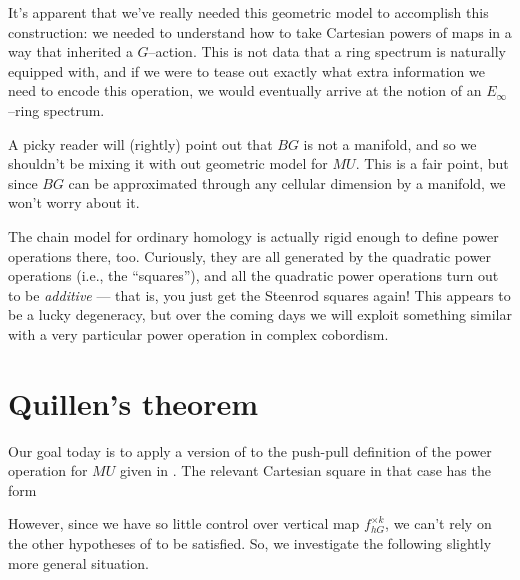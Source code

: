 \begin{remark}
It's apparent that we've really needed this geometric model to accomplish this construction: we needed to understand how to take Cartesian powers of maps in a way that inherited a $G$--action.  This is not data that a ring spectrum is naturally equipped with, and if we were to tease out exactly what extra information we need to encode this operation, we would eventually arrive at the notion of an $E_\infty$--ring spectrum.
\end{remark}

\begin{remark}
A picky reader will (rightly) point out that $BG$ is not a manifold, and so we shouldn't be mixing it with out geometric model for $MU$.  This is a fair point, but since $BG$ can be approximated through any cellular dimension by a manifold, we won't worry about it.
\end{remark}

\begin{remark}
The chain model for ordinary homology is actually rigid enough to define power operations there, too.  Curiously, they are all generated by the quadratic power operations (i.e., the ``squares''), and all the quadratic power operations turn out to be \emph{additive} --- that is, you just get the Steenrod squares again!  This appears to be a lucky degeneracy, but over the coming days we will exploit something similar with a very particular power operation in complex cobordism.
\end{remark}









\section{Quillen's theorem}


Our goal today is to apply a version of  to the push-pull definition of the power operation for $MU$ given in .  The relevant Cartesian square in that case has the form
\begin{center}
\end{center}
However, since we have so little control over vertical map $f^{\times k}_{hG}$, we can't rely on the other hypotheses of  to be satisfied.  So, we investigate the following slightly more general situation.

